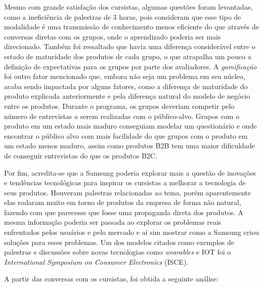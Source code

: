 Mesmo com grande satisfação dos cursistas, algumas questões foram levantadas, como a ineficiência de palestras de 3 horas, pois consideram que esse tipo de modalidade é uma transmissão de conhecimento menos eficiente do que através de conversas diretas com os grupos, onde o aprendizado poderia ser mais direcionado. Também foi ressaltado que havia uma diferença considerável entre o estado de maturidade dos produtos de cada grupo, o que atrapalha um pouco a definição de expectativas para os grupos por parte dos avaliadores. A \textit{gamificação} foi outro fator mencionado que, embora não seja um problema em seu núcleo, acaba sendo impactada por alguns fatores, como a diferença de maturidade do produto explicada anteriormente e pela diferença natural do modelo de negócio entre os produtos. Durante o programa, os grupos deveriam competir pelo número de entrevistas a serem realizadas com o público-alvo. Grupos com o produto em um estado mais maduro conseguiam modelar um questionário e onde encontrar o público alvo com mais facilidade do que grupos com o produto em um estado menos maduro, assim como produtos B2B tem uma maior dificuldade de conseguir entrevistas do que os produtos B2C. 

Por fim, acredita-se que a Samsung poderia explorar mais a questão de inovações e tendências tecnológicas para inspirar os cursistas a melhorar a tecnologia de seus produtos. Houveram palestras relacionadas ao tema, porém aparentemente elas rodaram muito em torno de produtos da empresa de forma não natural, fazendo com que parecesse que fosse uma propaganda direta dos produtos. A mesma informação poderia ser passada ao explorar os problemas reais enfrentados pelos usuários e pelo mercado e aí sim mostrar como a Samsung criou soluções para esses problemas. Um dos modelos citados como exemplos de palestras e discussões sobre novas tecnologias como \textit{wearables} e IOT foi o \textit{International Symposium on Consumer Electronics} (ISCE).

A partir das conversas com os cursistas, foi obtida a seguinte análise:

